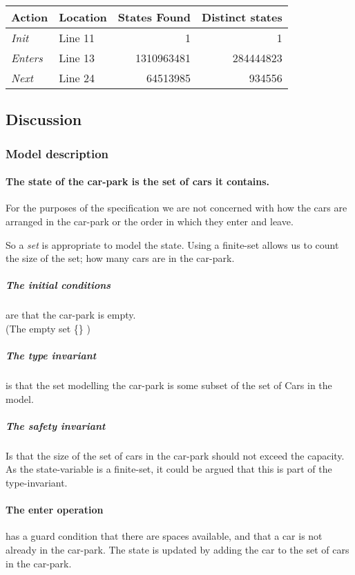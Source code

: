 \documentclass[12pt]{article}
\begin{document}
\begin{table}[h]
\begin{tabular}{llrr}
	\textbf{Action} & Location & States Found & \textbf{Distinct states} \\
	\hline
	\textit{Init} & Line 11 & 1 & 1 \\
	\textit{Enters} & Line 13 & \num{1310963481} & \num{284444823} \\
	\textit{Next} & Line 24 & \num{64513985} & \num{934556} 
\end{tabular}
\end{table}

\subsection{Discussion}
\subsubsection{Model description} 
\paragraph{The state of the car-park is the set of cars it contains.}
For the purposes of
the specification we are not concerned with how the cars are arranged in the
car-park or the order in which they enter and leave.  

So a \emph{set} is appropriate to model the state.  Using a finite-set allows
us to count the size of the set; how many cars are in the car-park.

\subparagraph{The initial conditions} are that the car-park is empty.\\
(The empty set \{\} )

\subparagraph{The type invariant} is that the set modelling the car-park is
some subset of the set of Cars in the model.

\subparagraph{The safety invariant} Is that the size of the set of cars in the
car-park should not exceed the capacity.  As the state-variable is a
finite-set, it could be argued that this is part of the type-invariant.

\paragraph{The enter operation} has a guard condition that
there are spaces available, and that a car is not already in the car-park.
The state is updated by adding the car to the set of cars in the car-park.
\end{document}
